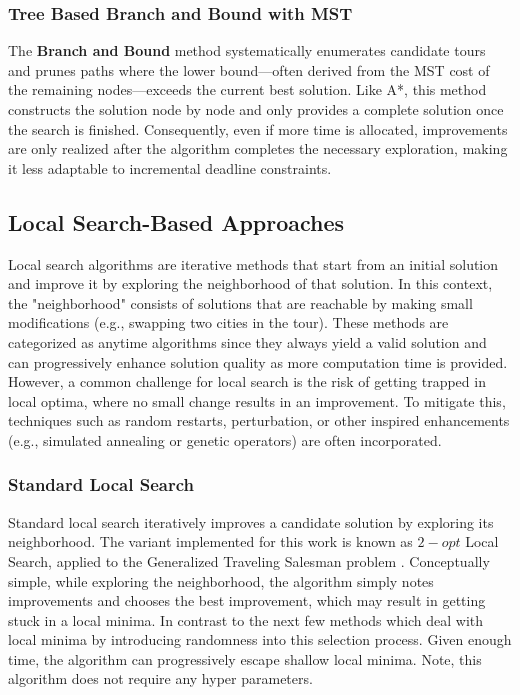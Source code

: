 \documentclass[11pt]{article}
\begin{document}
	\subsubsection{Tree Based Branch and Bound with MST}
	The \textbf{Branch and Bound} method\cite{MORRISON201679} systematically enumerates candidate tours and prunes paths where the lower bound—often derived from the MST cost of the remaining nodes—exceeds the current best solution. Like A*, this method constructs the solution node by node and only provides a complete solution once the search is finished. Consequently, even if more time is allocated, improvements are only realized after the algorithm completes the necessary exploration, making it less adaptable to incremental deadline constraints.

	\subsection{Local Search-Based Approaches}
	Local search algorithms are iterative methods that start from an initial solution and improve it by exploring the neighborhood of that solution. In this context, the "neighborhood" consists of solutions that are reachable by making small modifications (e.g., swapping two cities in the tour). These methods are categorized as anytime algorithms since they always yield a valid solution and can progressively enhance solution quality as more computation time is provided. However, a common challenge for local search is the risk of getting trapped in local optima, where no small change results in an improvement. To mitigate this, techniques such as random restarts, perturbation, or other inspired enhancements (e.g., simulated annealing or genetic operators) are often incorporated.
	
	\subsubsection{Standard Local Search}
	Standard local search iteratively improves a candidate solution by exploring its neighborhood. The variant implemented for this work is known as $2-opt$ Local Search, applied to the Generalized Traveling Salesman problem \cite{DIMITRIJEVIC1997105}. Conceptually simple, while exploring the neighborhood, the algorithm simply notes improvements and chooses the best improvement, which may result in getting stuck in a local minima. In contrast to the next few methods which deal with local minima by introducing randomness into this selection process. Given enough time, the algorithm can progressively escape shallow local minima. Note, this algorithm does not require any hyper parameters.
	
\end{document}
